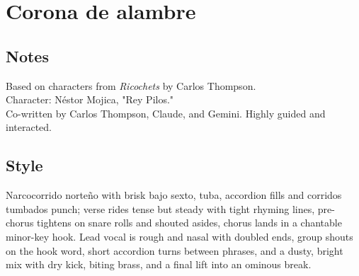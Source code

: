 \section{Corona de alambre}

\subsection{Notes}
Based on characters from \emph{Ricochets} by Carlos Thompson.\\
Character: Néstor Mojica, "Rey Pilos."\\
Co-written by Carlos Thompson, Claude, and Gemini. Highly guided and interacted.

\subsection{Style}
Narcocorrido norteño with brisk bajo sexto, tuba, accordion fills and corridos tumbados punch; verse rides tense but steady with tight rhyming lines, pre-chorus tightens on snare rolls and shouted asides, chorus lands in a chantable minor-key hook. Lead vocal is rough and nasal with doubled ends, group shouts on the hook word, short accordion turns between phrases, and a dusty, bright mix with dry kick, biting brass, and a final lift into an ominous break.

